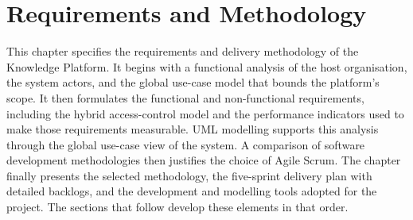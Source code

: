 \chapter{Requirements and Methodology}
\label{ch:requirements}

\newcommand{\backlogstart}[2]{%
  \footnotesize
  \setlength{\tabcolsep}{2.5pt}%
  \renewcommand{\arraystretch}{1.25}%
  \begin{longtable}{|>{\RaggedRight\arraybackslash}p{0.08\linewidth}|>{\RaggedRight\arraybackslash}p{0.11\linewidth}|>{\RaggedRight\arraybackslash}p{0.28\linewidth}|>{\Centering\arraybackslash}p{0.035\linewidth}|>{\Centering\arraybackslash}p{0.055\linewidth}|>{\RaggedRight\arraybackslash}p{0.33\linewidth}|}
  \caption{#1}\label{#2}\\
  \hline
  \textbf{ID} & \textbf{Req.} & \textbf{User Story} & \textbf{SP} & \textbf{Pri.} & \textbf{Acceptance Criteria} \\
  \hline
  \endfirsthead
  \multicolumn{6}{r}{\footnotesize\itshape continued from previous page}\\
  \hline
  \textbf{ID} & \textbf{Req.} & \textbf{User Story} & \textbf{SP} & \textbf{Pri.} & \textbf{Acceptance Criteria} \\
  \hline
  \endhead
  \hline
  \multicolumn{6}{r}{\footnotesize\itshape continued on next page}\\
  \endfoot
  \hline
  \endlastfoot
}
\newcommand{\backlogstop}{\end{longtable}}

This chapter specifies the requirements and delivery methodology of the Knowledge
Platform. It begins with a functional analysis of the host organisation, the
system actors, and the global use-case model that bounds the platform's scope.
It then formulates the functional and non-functional requirements, including the
hybrid access-control model and the performance indicators used to make those
requirements measurable. UML modelling supports this analysis through the global
use-case view of the system. A comparison of software development methodologies
then justifies the choice of Agile Scrum. The chapter finally presents the selected
methodology, the five-sprint delivery plan with detailed backlogs, and the
development and modelling tools adopted for the project. The sections that follow
develop these elements in that order.

